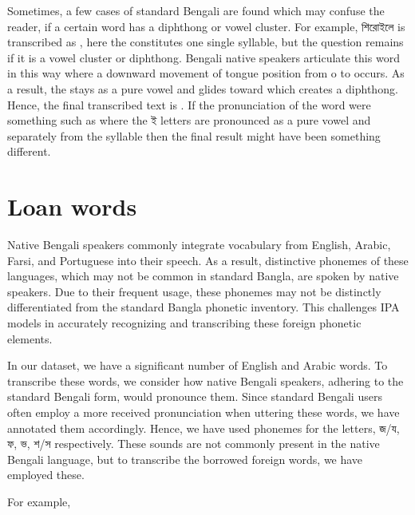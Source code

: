Sometimes, a few cases of standard Bengali are found which may confuse the reader, if a certain word has a diphthong or vowel cluster. For example, \textbengali{শিরোইলে} is transcribed as , here the  constitutes one single syllable, but the question remains if it is a vowel cluster or diphthong. Bengali native speakers articulate this word in this way where a downward movement of tongue position from o to  occurs. As a result, the  stays as a pure vowel and glides toward  which creates a diphthong. Hence, the final transcribed text is . If the pronunciation of the word were something such as  where the \textbengali{ই} letters are pronounced as a pure vowel and separately from the syllable then the final result might have been something different.

\section{Loan words}

Native Bengali speakers commonly integrate vocabulary from English, Arabic, Farsi, and Portuguese into their speech. As a result, distinctive phonemes of these languages, which may not be common in standard Bangla, are spoken by native speakers. Due to their frequent usage, these phonemes may not be distinctly differentiated from the standard Bangla phonetic inventory. This challenges IPA models in accurately recognizing and transcribing these foreign phonetic elements. 

In our dataset, we have a significant number of English and Arabic words. To transcribe these words, we consider how native Bengali speakers, adhering to the standard Bengali form, would pronounce them. Since standard Bengali users often employ a more received pronunciation when uttering these words, we have annotated them accordingly. Hence, we have used  phonemes for the letters,  \textbengali{জ/য, ফ, ভ, শ/স} respectively. These sounds are not commonly present in the native Bengali language, but to transcribe the borrowed foreign words, we have employed these.  

For example,

